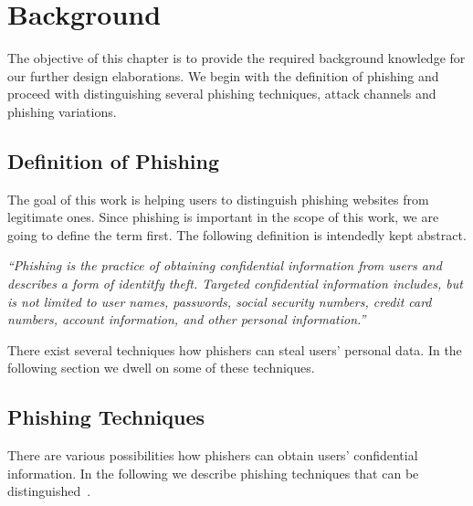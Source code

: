 \section{Background}
\label{s:background}
The objective of this chapter is to provide the required background knowledge for our further design elaborations. We begin with the definition of phishing and proceed with distinguishing several phishing techniques, attack channels and phishing variations.
\subsection{Definition of Phishing}
\label{s:phishing_def}
The goal of this work is helping users to distinguish phishing websites from legitimate ones. Since phishing is important in the scope of this work, we are going to define the term first. The following definition is intendedly kept abstract.

\begin{center}
\textit{``Phishing is the practice of obtaining confidential information from users and describes a form of identitfy theft. Targeted confidential information includes, but is not limited to user names, passwords, social security numbers, credit card numbers, account information, and other personal information.''}
\end{center}

There exist several techniques how phishers can steal users' personal data. In the following section we dwell on some of these techniques. 

\subsection{Phishing Techniques}
\label{s:phishing_techs}
There are various possibilities how phishers can obtain users' confidential information. In the following we describe phishing techniques that can be distinguished~\cite{jakobsson2006phishing}.

